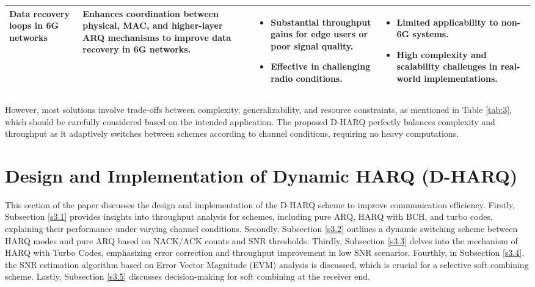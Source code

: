 \documentclass[sn-mathphys-num]{sn-jnl}
\theoremstyle{thmstyleone}
\theoremstyle{thmstyletwo}%
\theoremstyle{thmstylethree}%
\begin{document}
\begin{longtable}{|>{\centering\arraybackslash}m{3.2cm}|>{\centering\arraybackslash}m{4.3cm}|>{\centering\arraybackslash}m{3.75cm}|>{\centering\arraybackslash}m{3.75cm}|}
Data recovery loops in 6G networks \cite{r31}& Enhances coordination between physical, MAC, and higher-layer ARQ mechanisms to improve data recovery in 6G networks. & 
\begin{itemize}
    \item Substantial throughput gains for edge users or poor signal quality.
    \item Effective in challenging radio conditions.
\end{itemize} & 
\begin{itemize}
    \item Limited applicability to non-6G systems.
    \item High complexity and scalability challenges in real-world implementations.
\end{itemize} \\ 
\hline

\end{longtable}

However, most solutions involve trade-offs between complexity, generalizability, and resource constraints, as mentioned in Table \ref{tab:3}, which should be carefully considered based on the intended application. The proposed D-HARQ perfectly balances complexity and throughput as it adaptively switches between schemes according to channel conditions, requiring no heavy computations.

\section{Design and Implementation of Dynamic HARQ (D-HARQ)} \label{s3}

This section of the paper discusses the design and implementation of the D-HARQ scheme to improve communication efficiency. Firstly, Subsection \ref{s3.1} provides insights into throughput analysis for schemes, including pure ARQ, HARQ with BCH, and turbo codes, explaining their performance under varying channel conditions. Secondly, Subsection \ref{s3.2} outlines a dynamic switching scheme between HARQ modes and pure ARQ based on NACK/ACK counts and SNR thresholds. Thirdly, Subsection \ref{s3.3} delves into the mechanism of HARQ with Turbo Codes, emphasizing error correction and throughput improvement in low SNR scenarios. Fourthly, in Subsection \ref{s3.4}, the SNR estimation algorithm based on Error Vector Magnitude (EVM) analysis is discussed, which is crucial for a selective soft combining scheme. Lastly, Subsection \ref{s3.5} discusses decision-making for soft combining at the receiver end.
\end{document}
